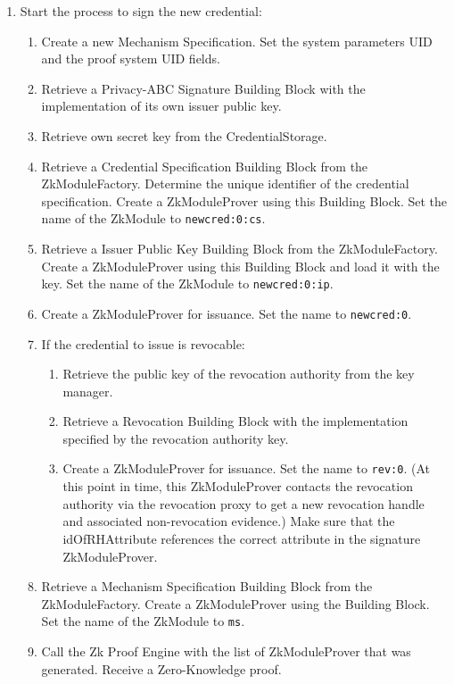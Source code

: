 \begin{enumerate}
      \item Start the process to sign the new credential:
      \begin{enumerate}
      \item Create a new Mechanism Specification. Set the system parameters UID and the proof system UID fields.
      \item Retrieve a Privacy-ABC Signature Building Block with the implementation of its own issuer public key.
      \item Retrieve own secret key from the CredentialStorage.
      \item Retrieve a Credential Specification Building Block from the ZkModuleFactory. Determine the unique identifier
        of the credential specification. Create a ZkModuleProver using this Building Block. Set the name of the ZkModule to
        \texttt{newcred:0:cs}.
      \item Retrieve a Issuer Public Key Building Block from the ZkModuleFactory.
        Create a ZkModuleProver using this Building Block and load it with the key. Set the name of the ZkModule to
        \texttt{newcred:0:ip}.
      \item Create a ZkModuleProver for issuance. Set the name to \texttt{newcred:0}.
      \item If the credential to issue is revocable:
      \begin{enumerate}
        \item Retrieve the public key of the revocation authority from the key manager.
        \item Retrieve a Revocation Building Block with the implementation specified by the revocation authority key.
        \item Create a ZkModuleProver for issuance. Set the name to \texttt{rev:0}. (At this point in time, this ZkModuleProver
          contacts the revocation authority via the revocation proxy to get a new revocation handle and associated
          non-revocation evidence.) Make sure that the idOfRHAttribute references the correct attribute in the signature ZkModuleProver.
      \end{enumerate}
      \item Retrieve a Mechanism Specification Building Block from the ZkModuleFactory.
      Create a ZkModuleProver using the Building Block. Set the name of the ZkModule to
      \texttt{ms}.
      \item Call the Zk Proof Engine with the list of ZkModuleProver that was generated. Receive a Zero-Knowledge proof.


\end{enumerate}
\end{enumerate}
